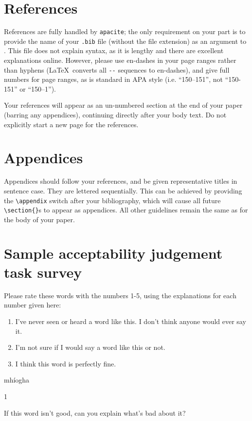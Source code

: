 \documentclass[xelatex,linguex]{TWPL}
\begin{document}
\section{References}

References are fully handled by \texttt{apacite}; the only requirement on your part is to provide the name of your \texttt{.bib} file (without the file extension) as an argument to \verb;;. This file does not explain  syntax, as it is lengthy and there are excellent explanations online. However, please use en-dashes in your page ranges rather than hyphens (\LaTeX\ converts all \verb;--; sequences to en-dashes), and give full numbers for page ranges, as is standard in APA style (i.e. ``150--151'', not ``150-151'' or ``150--1'').

Your references will appear as an un-numbered section at the end of your paper (barring any appendices), continuing directly after your body text. Do not explicitly start a new page for the references. 

\section{Appendices}

Appendices should follow your references, and be given representative titles in sentence case. They are lettered sequentially. This can be achieved by providing the \verb;\appendix; switch after your bibliography, which will cause all future \verb;\section{};s to appear as appendices. All other guidelines remain the same as for the body of your paper.

\nocite{rice1994, hall2011, praat, R, zeijlstra2008, lehiste1970}



\appendix

\section{Sample acceptability judgement task survey}

Please rate these words with the numbers 1-5, using the explanations for each number given here:

\begin{enumerate}
	\item  I've never seen or heard a word like this. I don't think anyone would ever say it.
	\item  I'm not sure if I would say a word like this or not.
	\item  I think this word is perfectly fine.
\end{enumerate}

	mh\'iogha

	\medskip

	1  		

	\medskip

	If this word isn't good, can you explain what's bad about it?
\end{document}
